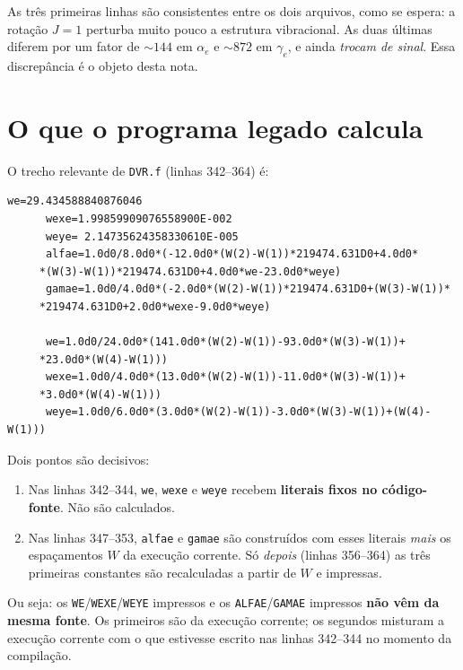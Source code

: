 \documentclass[11pt,a4paper]{article}
\newcommand{\alfae}{\alpha_e}
\newcommand{\gamae}{\gamma_e}
\begin{document}
\noindent
As três primeiras linhas são consistentes entre os dois arquivos, como se
espera: a rotação $J=1$ perturba muito pouco a estrutura vibracional. As duas
últimas diferem por um fator de $\sim\!144$ em $\alfae$ e $\sim\!872$ em
$\gamae$, e ainda \emph{trocam de sinal}. Essa discrepância é o objeto desta
nota.

\section{O que o programa legado calcula}

O trecho relevante de \texttt{DVR.f} (linhas 342--364) é:

\begin{lstlisting}[caption={\texttt{DVR.f}, linhas 342--364 (indentação original).},
                   firstnumber=342]
      we=29.434588840876046
      wexe=1.99859909076558900E-002
      weye= 2.14735624358330610E-005
      alfae=1.0d0/8.0d0*(-12.0d0*(W(2)-W(1))*219474.631D0+4.0d0*
     *(W(3)-W(1))*219474.631D0+4.0d0*we-23.0d0*weye)
      gamae=1.0d0/4.0d0*(-2.0d0*(W(2)-W(1))*219474.631D0+(W(3)-W(1))*
     *219474.631D0+2.0d0*wexe-9.0d0*weye)

      we=1.0d0/24.0d0*(141.0d0*(W(2)-W(1))-93.0d0*(W(3)-W(1))+
     *23.0d0*(W(4)-W(1)))
      wexe=1.0d0/4.0d0*(13.0d0*(W(2)-W(1))-11.0d0*(W(3)-W(1))+
     *3.0d0*(W(4)-W(1)))
      weye=1.0d0/6.0d0*(3.0d0*(W(2)-W(1))-3.0d0*(W(3)-W(1))+(W(4)-W(1)))
\end{lstlisting}

\noindent
Dois pontos são decisivos:

\begin{enumerate}
\item Nas linhas 342--344, \texttt{we}, \texttt{wexe} e \texttt{weye} recebem
      \textbf{literais fixos no código-fonte}. Não são calculados.
\item Nas linhas 347--353, \texttt{alfae} e \texttt{gamae} são construídos com
      esses literais \emph{mais} os espaçamentos $W$ da execução corrente. Só
      \emph{depois} (linhas 356--364) as três primeiras constantes são
      recalculadas a partir de $W$ e impressas.
\end{enumerate}

\noindent
Ou seja: os \texttt{WE}/\texttt{WEXE}/\texttt{WEYE} impressos e os
\texttt{ALFAE}/\texttt{GAMAE} impressos \textbf{não vêm da mesma fonte}. Os
primeiros são da execução corrente; os segundos misturam a execução corrente
com o que estivesse escrito nas linhas 342--344 no momento da compilação.
\end{document}
